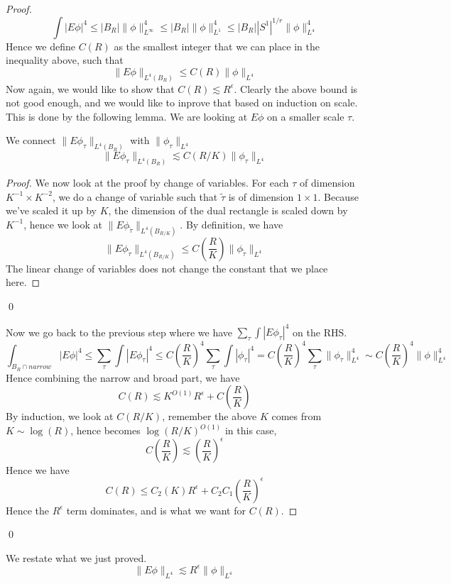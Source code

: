 \begin{proof}
\begin{equation*}
        \int|E\phi|^4\leq|B_R|\|\phi\|_{L^\infty}^4\leq|B_R|\|\phi\|_{L^1}^4\leq |B_R||S^1|^{1/r}\|\phi\|_{L^4}^4
    \end{equation*}
    Hence we define $C(R)$ as the smallest integer that we can place in the inequality above, such that 
    \begin{equation*}
        \|E\phi\|_{L^4(B_R)}\leq C(R)\|\phi\|_{L^4}
    \end{equation*}
    Now again, we would like to show that $C(R)\lesssim R^\epsilon$. Clearly the above bound is not good enough, and we would like to inprove that based on induction on scale. This is done by the following lemma. We are looking at $E\phi$ on a smaller scale $\tau$.
    \begin{lemma}
        We connect $\|E\phi_\tau\|_{L^4
        (B_R)}$ with $\|\phi_\tau\|_{L^4}$
        \begin{equation*}
            \|E\phi_\tau\|_{L^4(B_R)}\lesssim C(R/K)\|\phi_\tau\|_{L^4}
        \end{equation*}
    \end{lemma}
    \begin{proof}
        We now look at the proof by change of variables. For each $\tau$ of dimension $K^{-1}\times K^{-2}$, we do a change of variable such that $\tilde{\tau}$ is of dimension $1\times 1$. Because we've scaled it up by $K$, the dimension of the dual rectangle is scaled down by $K^{-1}$, hence we look at $\|E\phi_{\tilde{\tau}}\|_{L^4(B_{R/K})}$. By definition, we have
        \begin{equation*}
            \|E\phi_{\tilde{\tau}}\|_{L^4(B_{R/K})}\leq C\left(\frac{R}{K}\right)\|\phi_{\tilde{\tau}}\|_{L^4}
        \end{equation*}
        The linear change of variables does not change the constant that we place here.
    \end{proof}
    \qed

    Now we go back to the previous step where we have $\sum_\tau\int|E\phi_\tau|^4$ on the RHS.
    \begin{equation*}
        \int_{B_R\cap narrow}|E\phi|^4\leq\sum_\tau\int|E\phi_\tau|^4\leq C\left(\frac{R}{K}\right)^4\sum_\tau\int|\phi_\tau|^4=C\left(\frac{R}{K}\right)^4\sum_\tau\|\phi_\tau\|_{L^4}^4\sim C\left(\frac{R}{K}\right)^4\|\phi\|_{L^4}^4
    \end{equation*}
Hence combining the narrow and broad part, we have 
\begin{equation*}
    C(R)\lesssim K^{O(1)}R^\epsilon+C\left(\frac{R}{K}\right)
\end{equation*}
By induction, we look at $C(R/K)$, remember the above $K$ comes from $K\sim\log(R)$, hence becomes $\log(R/K)^{O(1)}$ in this case,
\begin{equation*}
    C\left(\frac{R}{K}\right)\lesssim \left(\frac{R}{K}\right)^\epsilon
\end{equation*}
Hence we have
\begin{equation*}
    C(R)\leq C_2(K)R^\epsilon+C_2C_1\left(\frac{R}{K}\right)^\epsilon
\end{equation*}
Hence the $R^\epsilon$ term dominates, and is what we want for $C(R)$.
\end{proof}
\qed

We restate what we just proved.
\begin{equation*}
    \|E\phi\|_{L^4}\lesssim R^\epsilon\|\phi\|_{L^4}
\end{equation*}
